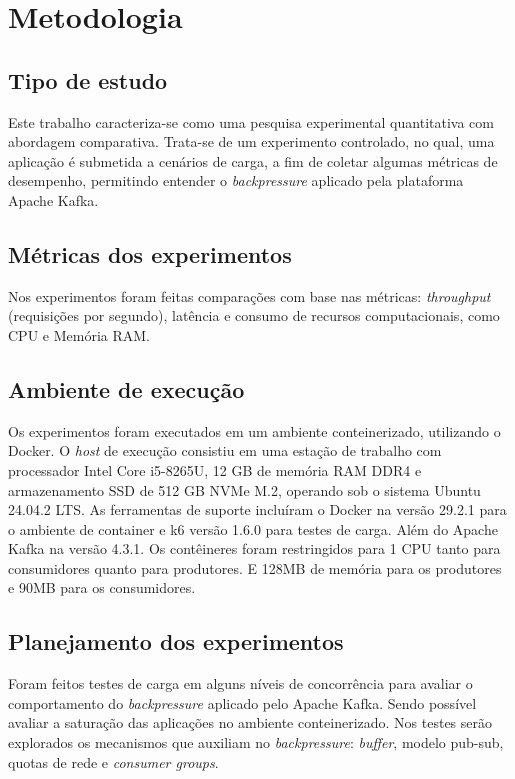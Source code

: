 \documentclass[12pt]{article}
\begin{document}
  \section{Metodologia}

  \subsection{Tipo de estudo}
  Este trabalho caracteriza-se como uma pesquisa experimental quantitativa com abordagem comparativa. Trata-se de um experimento controlado, no qual, uma aplicação é submetida a cenários de carga, a fim de coletar algumas métricas de desempenho, permitindo entender o \textit{backpressure} aplicado pela plataforma Apache Kafka.

  \subsection{Métricas dos experimentos}
  Nos experimentos foram feitas comparações com base nas métricas: \textit{throughput} (requisições por segundo), latência e consumo de recursos computacionais, como CPU e Memória RAM.

  \subsection{Ambiente de execução}
  Os experimentos foram executados em um ambiente conteinerizado, utilizando o Docker. O \textit{host} de execução consistiu em uma estação de trabalho com processador Intel Core i5-8265U, 12 GB de memória RAM DDR4 e armazenamento SSD de 512 GB NVMe M.2, operando sob o sistema Ubuntu 24.04.2 LTS. As ferramentas de suporte incluíram o Docker na versão 29.2.1 para o ambiente de container e k6 versão 1.6.0 para testes de carga. Além do Apache Kafka na versão 4.3.1. Os contêineres foram restringidos para 1 CPU tanto para consumidores quanto para produtores. E 128MB de memória para os produtores e 90MB para os consumidores.

  \subsection{Planejamento dos experimentos}
  Foram feitos testes de carga em alguns níveis de concorrência para avaliar o comportamento do \textit{backpressure} aplicado pelo Apache Kafka. Sendo possível avaliar a saturação das aplicações no ambiente conteinerizado. Nos testes serão explorados os mecanismos que auxiliam no \textit{backpressure}: \textit{buffer}, modelo pub-sub, quotas de rede e \textit{consumer groups}.
\end{document}
